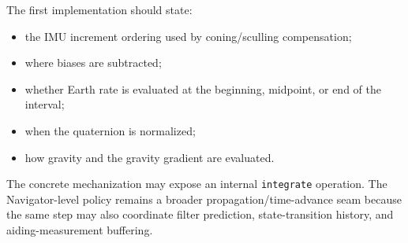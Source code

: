 The first implementation should state:
\begin{itemize}
    \item the IMU increment ordering used by coning/sculling compensation;
    \item where biases are subtracted;
    \item whether Earth rate is evaluated at the beginning, midpoint, or end of
    the interval;
    \item when the quaternion is normalized;
    \item how gravity and the gravity gradient are evaluated.
\end{itemize}

\begin{implbox}
The concrete mechanization may expose an internal \texttt{integrate} operation.
The Navigator-level policy remains a broader propagation/time-advance seam
because the same step may also coordinate filter prediction, state-transition
history, and aiding-measurement buffering.
\end{implbox}
